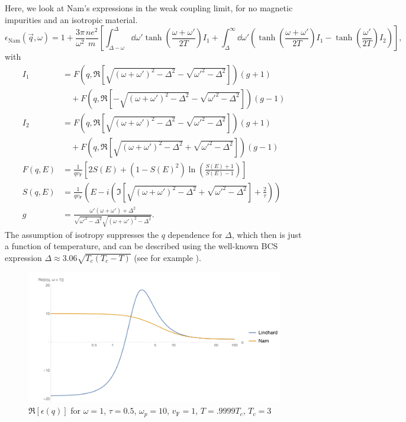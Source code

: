 \documentclass{article}
\newcommand{\vf}{v_{\mathrm{F}}}
\begin{document}
Here, we look at Nam's expressions in the weak coupling limit, for no magnetic impurities and an isotropic material.
\begin{equation}
	\epsilon_{\mathrm{Nam}}(\vec{q}, \omega) = 1 + \frac{3 \pi}{\omega^2} \frac{n e^2}{m} \left[\int_{\Delta - \omega}^{\Delta}\dd{\omega'} \tanh(\frac{\omega + \omega'}{2 T}) I_1 + \int_{\Delta}^{\infty} \dd{\omega'} \left( \tanh(\frac{\omega + \omega'}{2 T}) I_1  - \tanh(\frac{\omega'}{2 T})I_2 \right) \right], \label{eq:eps}
\end{equation}
with
\begin{align}
	I_1 &= F(q, \Re[\sqrt{(\omega + \omega')^2 - \Delta^2} - \sqrt{\omega'^2 - \Delta^2}]) (g + 1) \nonumber\\
	&\quad + F(q, \Re[-\sqrt{(\omega + \omega')^2 - \Delta^2} - \sqrt{\omega'^2 - \Delta^2}]) (g - 1) \\
	I_2 &= F(q, \Re[\sqrt{(\omega + \omega')^2 - \Delta^2} - \sqrt{\omega'^2 - \Delta^2}]) (g + 1) \nonumber\\
	&\quad + F(q, \Re[\sqrt{(\omega +  \omega')^2 - \Delta^2} + \sqrt{\omega'^2 - \Delta^2}]) (g - 1) \\
	F(q, E) &= \frac{1}{q \vf} \left[2 S(E) + (1 - S(E)^2)\ln(\frac{S(E) + 1}{S(E) - 1})\right] \label{eq:NamF} \\
	S(q, E) &= \frac{1}{q \vf} \left( E - i \left(\Im[\sqrt{(\omega + \omega')^2 - \Delta^2} + \sqrt{\omega'^2 - \Delta^2}] + \frac{2}{\tau} \right) \right) \\
	g &= \frac{\omega' \left(\omega + \omega'\right) + \Delta^2}{\sqrt{\omega'^2 - \Delta^2}\sqrt{(\omega + \omega')^2 - \Delta^2}}.
\end{align}
The assumption of isotropy suppresses the $q$ dependence for $\Delta$, which then is just a function of temperature, and can be described using the well-known BCS expression $\Delta \approx 3.06 \sqrt{T_c(T_c - T)}$ (see for example \cite{Tinkham}).

\begin{figure}[htp]
	\centering
	\includegraphics[width=12cm]{Cond1Re}
	\caption{$\Re[\epsilon(q)]$ for $\omega = 1$, $\tau = 0.5$, $\omega_p = 10$, $\vf = 1$, $T = .9999 T_c$, $T_c = 3$} \label{fig:cond1Re}
\end{figure}
\end{document}
